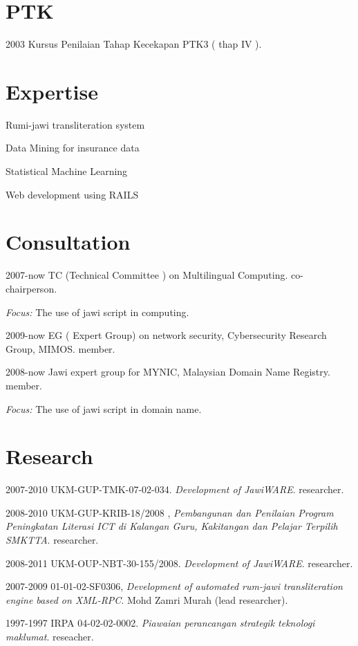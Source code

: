 \documentclass[a4paper]{article}
\begin{document}
\section{PTK}
\begin{CV}
\item[2003] Kursus Penilaian Tahap Kecekapan PTK3 ( thap IV ).
\end{CV}
\section{Expertise}
\begin{CV}
\item[Rumi-jawi transliteration system]
\item[Data Mining for insurance data]
\item[Statistical Machine Learning]
\item[Web development using RAILS]
\end{CV}


\section{Consultation}
\begin{CV}
\item[2007-now] TC (Technical Committee ) on Multilingual Computing. co-chairperson.

\emph{Focus:} The use of jawi script in computing.

\item[2009-now] EG ( Expert Group) on network security, Cybersecurity Research Group, MIMOS. member.

\item[2008-now] Jawi expert group for MYNIC, Malaysian Domain Name Registry. member.

\emph{Focus:} The use of jawi script in domain name.
\end{CV}

\section{Research}

\begin{CV}
\item[2007-2010] UKM-GUP-TMK-07-02-034. \textit{Development of JawiWARE}. researcher.
\item[2008-2010] UKM-GUP-KRIB-18/2008 , \textit{Pembangunan dan Penilaian Program Peningkatan Literasi ICT di Kalangan Guru, Kakitangan dan Pelajar Terpilih SMKTTA}. researcher.
\item[2008-2011] UKM-OUP-NBT-30-155/2008. \textit{Development of JawiWARE}. researcher.
\item[2007-2009] 01-01-02-SF0306, \textit{Development of automated rum-jawi transliteration engine based on XML-RPC}. Mohd Zamri Murah (lead researcher).
\item[1997-1997]  IRPA 04-02-02-0002. \textit{Piawaian perancangan strategik teknologi maklumat}. reseacher.
\end{CV}
\end{document}
